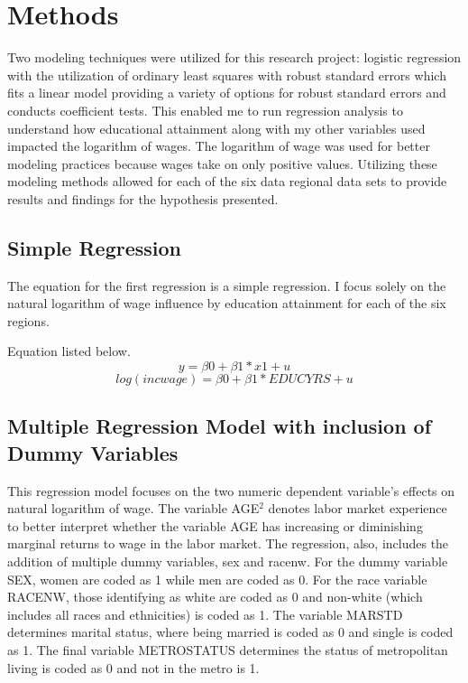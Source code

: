 \documentclass[12pt, English]{article}
\begin{document}
\section{Methods}
Two modeling techniques were utilized for this research project: logistic regression with the utilization of ordinary least squares with robust standard errors which fits a linear model providing a variety of options for robust standard errors and conducts coefficient tests. This enabled me to run regression analysis to understand how educational attainment along with my other variables used impacted the logarithm of wages. The logarithm of wage was used for better modeling practices because wages take on only positive values. Utilizing these modeling methods allowed for each of the six data regional data sets to provide results and findings for the hypothesis presented.  

\subsection{Simple Regression}
The equation for the first regression is a simple regression. I focus solely on the natural logarithm of wage influence by education attainment for each of the six regions. 

Equation listed below.
\begin{equation}
y = \beta0 + \beta1*x1 + u
\end{equation}
\begin{equation}
    log(incwage) = \beta0 + \beta1*EDUCYRS + u 
\end{equation}
\subsection{Multiple Regression Model with inclusion of Dummy Variables}
This regression model focuses on the two numeric dependent variable’s effects on natural logarithm of wage. The variable AGE$^2$ denotes labor market experience to better interpret whether the variable AGE has increasing or diminishing marginal returns to wage in the labor market. The regression, also, includes the addition of multiple dummy variables, sex and racenw. For the dummy variable SEX, women are coded as 1 while men are coded as 0. For the race variable RACENW, those identifying as white are coded as 0 and non-white (which includes all races and ethnicities) is coded as 1. The variable MARSTD determines marital status, where being married is coded as 0 and single is coded as 1. The final variable METROSTATUS determines the status of metropolitan living is coded as 0 and not in the metro is 1.  
\end{document}
